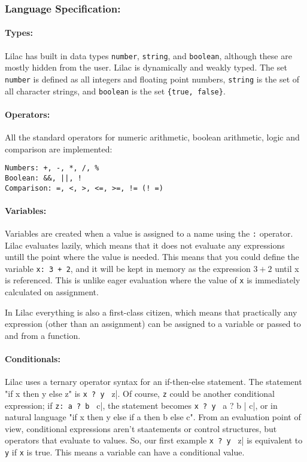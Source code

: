 \documentclass[a4paper, 12pt]{article}
\begin{document}
\subsubsection{Language Specification:}\label{sec:language-specification}
\paragraph{Types:}
Lilac has built in data types \verb|number|, \verb|string|, and \verb|boolean|, although these are mostly hidden from the user. Lilac is dynamically and weakly typed. The set \verb|number| is defined as all integers and floating point numbers, \verb|string| is the set of all character strings, and \verb|boolean| is the set \verb|{true, false}|.\\

\paragraph{Operators:}
All the standard operators for numeric arithmetic, boolean arithmetic, logic and comparison are implemented:\\
\begin{verbatim}
Numbers: +, -, *, /, %
Boolean: &&, ||, !
Comparison: =, <, >, <=, >=, != (! =)
\end{verbatim}

\paragraph{Variables:}
Variables are created when a value is assigned to a name using the \verb|:| operator. Lilac evaluates lazily, which means that it does not evaluate any expressions untill the point where the value is needed. This means that you could define the variable \verb|x: 3 + 2|, and it will be kept in memory as the expression $3+2$ until x is referenced. This is unlike eager evaluation where the value of \verb|x| is immediately calculated on assignment.

In Lilac everything is also a first-class citizen, which means that practically any expression (other than an assignment) can be assigned to a variable or passed to and from a function.

\paragraph{Conditionals:}
Lilac uses a ternary operator syntax for an if-then-else statement. The statement "if x then y else z" is \verb|x ? y | z|. Of course, \verb|z| could be another conditional expression; if \verb|z: a ? b | c|, the statement becomes \verb|x ? y | a ? b | c|, or in natural language "if x then y else if a then b else c". From an evaluation point of view, conditional expressions aren't staatements or control structures, but operators that evaluate to values. So, our first example \verb|x ? y | z| is equivalent to \verb|y| if \verb|x| is true. This means a variable can have a conditional value.
\end{document}
